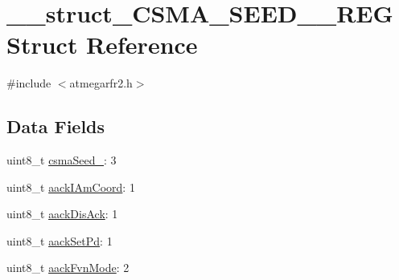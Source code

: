 \hypertarget{struct____struct___c_s_m_a___s_e_e_d__1___r_e_g}{\section{\-\_\-\-\_\-struct\-\_\-\-C\-S\-M\-A\-\_\-\-S\-E\-E\-D\-\_\-\_\-\-R\-E\-G Struct Reference}
\label{struct____struct___c_s_m_a___s_e_e_d__1___r_e_g}
}


{\ttfamily \#include $<$atmegarfr2.\-h$>$}

\subsection*{Data Fields}
\begin{DoxyCompactItemize}
\item 
uint8\-\_\-t \hyperlink{struct____struct___c_s_m_a___s_e_e_d__1___r_e_g_a0ec3afb08beac54bb8fe108b94662e30}{csma\-Seed\-\_}\-: 3
\item 
uint8\-\_\-t \hyperlink{struct____struct___c_s_m_a___s_e_e_d__1___r_e_g_ab3153f07f98c7e6e820c49df105d7eed}{aack\-I\-Am\-Coord}\-: 1
\item 
uint8\-\_\-t \hyperlink{struct____struct___c_s_m_a___s_e_e_d__1___r_e_g_a13368b92370ff19f02270520d0f245a7}{aack\-Dis\-Ack}\-: 1
\item 
uint8\-\_\-t \hyperlink{struct____struct___c_s_m_a___s_e_e_d__1___r_e_g_a49c60b8e44dbae4ea80f68446c12398b}{aack\-Set\-Pd}\-: 1
\item 
uint8\-\_\-t \hyperlink{struct____struct___c_s_m_a___s_e_e_d__1___r_e_g_a9086eacfda9af702abbcf51be8de8dfd}{aack\-Fvn\-Mode}\-: 2
\end{DoxyCompactItemize}


